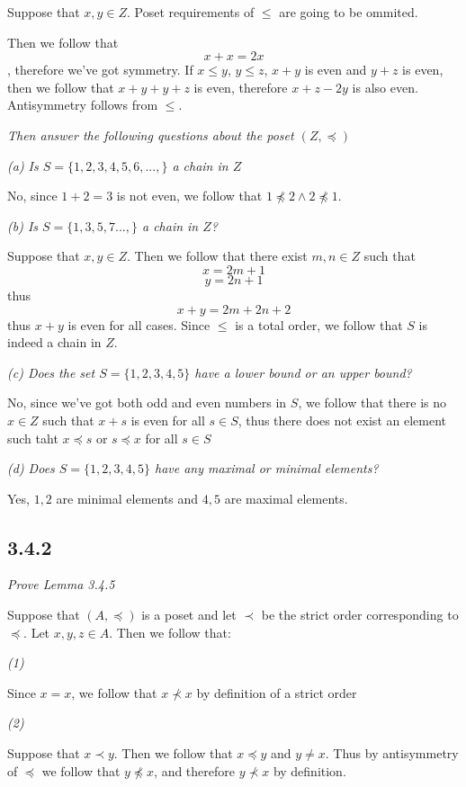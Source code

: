 \documentclass[11pt,oneside,titlepage]{book}
\begin{document}
Suppose that $x, y \in Z$. Poset requirements of $\leq$ are going to be ommited.

Then we follow that $$x + x = 2x$$, therefore we've got symmetry.
If $x \leq y$, $y \leq z$, $x + y$ is even and $y + z$ is even, then we follow that
$x + y + y + z$ is even, therefore $x + z - 2y$ is also even.
Antisymmetry follows from $\leq$.

\textit{Then answer the following questions about the poset $(Z, \preceq)$}

\textit{(a) Is $S = \{1, 2, 3, 4, 5, 6, ..., \}$ a chain in $Z$}

No, since $1 + 2 = 3$ is not even, we follow that $1 \not \preceq 2 \land 2 \not \preceq 1$.

\textit{(b) Is $S = \{1, 3, 5, 7 ...,\}$ a chain in $Z$?}

Suppose that $x, y \in Z$. Then we follow that there exist $m, n \in Z$ such that
$$x = 2m + 1$$
$$y = 2n + 1$$
thus
$$x + y = 2m + 2n + 2$$
thus $x + y$ is even for all cases. Since $\leq$ is a total order, we follow that $S$ is
indeed a chain in $Z$.

\textit{(c) Does the  set $S = \{1, 2, 3, 4, 5\}$ have a lower bound or an upper bound?}

No, since we've got both odd and even numbers in $S$, we follow that there is no $x \in Z$ such that
$x + s$ is even for all $s \in S$, thus there does not exist an element such taht
$x \preceq s$ or $s \preceq x$ for all $s \in S$

\textit{(d) Does $S = \{1, 2, 3, 4, 5\}$ have any maximal or minimal elements?}

Yes, $1, 2$ are minimal elements and $4, 5$ are maximal elements.


\subsection*{3.4.2}

\textit{Prove Lemma 3.4.5}

Suppose that $(A, \preceq)$ is a poset and let $\prec$ be the strict order corresponding to
$\preceq$. Let $x, y, z \in A$. Then we follow that:

\textit{(1)}

Since $x = x$, we follow that $x \not \prec x$ by definition of a strict order

\textit{(2)}

Suppose that $x \prec y$. Then we follow that $x \preceq y$ and $y \neq x$. Thus by antisymmetry
of $\preceq$ we follow that $y \not \preceq x$, and therefore $y \not \prec x$ by definition.
\end{document}
